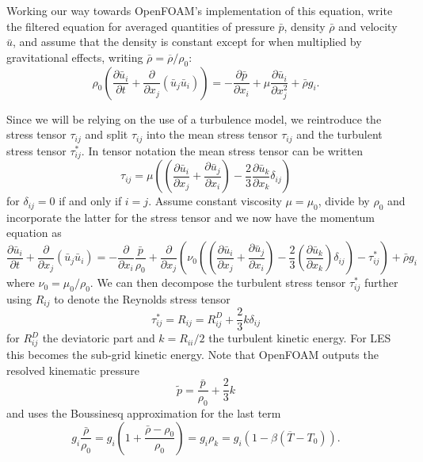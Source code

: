 Working our way towards OpenFOAM's implementation of this equation, write the filtered equation for averaged quantities of pressure $\bar{p}$, density $\bar{\rho}$ and velocity $\bar{u}$, and assume that the density is constant except for when multiplied by gravitational effects, writing $\bar{\rho} = \overline{\rho} / \rho _0$:
\begin{equation} \rho _0 \left ( \frac{\partial \bar{u}_i}{\partial t} + \frac{\partial}{\partial x_j} \left( \bar{u}_j \bar{u}_i \right) \right )
= -\frac{\partial \bar{p}} {\partial{x_i}} +  \mu \frac{\partial \bar{u}_i}{\partial x_j^2} + \bar{\rho} g_i. \end{equation}

Since we will be relying on the use of a turbulence model, we reintroduce the stress tensor $\tau _{ij}$ and split $\tau_{ij}$ into the mean stress tensor $\tau _{ij}$ and the turbulent stress tensor $\tau ^* _{ij}$.
In tensor notation the mean stress tensor can be written
\begin{equation*} \tau _{ij} = \mu \left ( \left ( \frac{\partial \bar{u} _i}{\partial x_j} + \frac{\partial \bar{u} _j }{\partial x_i} \right) - \frac{2}{3} \frac{\partial \bar{u}_k} {\partial x_k} \delta _{ij} \right ) \end{equation*}
for $\delta _{ij} = 0$ if and only if $i=j$.
Assume constant viscosity $\mu = \mu _0$, divide by $\rho _0$ and incorporate the latter for the stress tensor and we now have the momentum equation as
\begin{equation*} \frac{\partial \bar{u}_i}{\partial t} + \frac{\partial}{\partial x_j} \left( \bar{u}_j \bar{u}_i \right) 
= -\frac{\partial } {\partial{x_i}} \frac{\bar{p}}{\rho_0} + \frac{\partial }{\partial x_j} \left ( \nu _0 \left ( \left ( \frac{\partial \bar{u}_i} {\partial x_j} + \frac{\partial \bar{u} _j}{\partial x_i} \right ) - \frac{2}{3}\left ( \frac{\partial \bar{u} _k}{\partial x_k }\right ) \delta _{ij}\right ) - \tau ^* _{ij} \right ) + \bar{\rho} g_i \end{equation*}
where $\nu _0 = \mu _0 /\rho _0$.
We can then decompose the turbulent stress tensor $\tau ^* _{ij}$ further using $R_{ij}$ to denote the Reynolds stress tensor
\begin{equation*} \tau ^* _{ij} = R_{ij} = R^D _{ij} + \frac{2}{3} k \delta _{ij} \end{equation*}
for $R_{ij}^D$ the deviatoric part and $k = R_{ii}/2$ the turbulent kinetic energy.
For LES this becomes the sub-grid kinetic energy.
Note that OpenFOAM outputs the resolved kinematic pressure
\begin{equation*} \tilde{p} = \frac{\bar{p} }{\rho _0} + \frac{2}{3}k \end{equation*}
and uses the Boussinesq approximation for the last term
\begin{equation*} g_i\frac{\bar{\rho}}{\rho _0} = g_i \left ( 1 + \frac{\bar{\rho} - \rho _0}{\rho _0} \right ) = g_i \rho _k  = g_i \left (1 - \beta \left (\overline{T} - T _0\right ) \right ) .\end{equation*}

